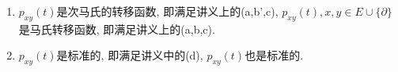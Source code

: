 \documentclass{ctexart}
\newif\ifpreface
\begin{document}
\large
\setlength{\baselineskip}{1.2em}
\ifpreface

\newgeometry{left=2cm,right=2cm,top=2cm,bottom=2cm}
\else
{}
\maketitle
\fi
\begin{problem}\label{pro:1}
  \begin{enumerate}
    \item  \(p_{xy}(t)\)是次马氏的转移函数, 即满足讲义上的(a,b',c),
      \(p_{xy}(t), x,y\in E\cup \{\partial\}\)是马氏转移函数, 即满足讲义上的(a,b,c).
    \item  \(p_{xy}(t)\)是标准的, 即满足讲义中的(d),  \(p_{xy}(t)\)也是标准的.
  \end{enumerate}
\end{problem}
\end{document}
